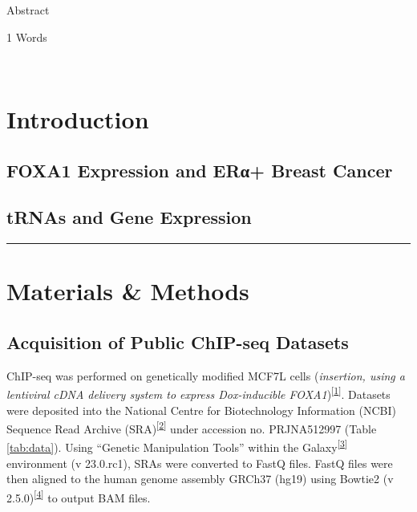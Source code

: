 \documentclass[
  12pt,
]{article}
\begin{document}
Abstract

\normalsize
\begin{flushright}
1 Words
\end{flushright}
\hrulefill\\
\setlength{\parindent}{10pt}

\hypertarget{introduction}{%
\section{Introduction}\label{introduction}}

\hypertarget{foxa1-expression-and-erux3b1-breast-cancer}{%
\subsection{FOXA1 Expression and ERα+ Breast Cancer}\label{foxa1-expression-and-erux3b1-breast-cancer}}

\hypertarget{trnas-and-gene-expression}{%
\subsection{tRNAs and Gene Expression}\label{trnas-and-gene-expression}}

\begin{center}\rule{0.5\linewidth}{0.5pt}\end{center}

\hypertarget{materials-methods}{%
\section{Materials \& Methods}\label{materials-methods}}

\hypertarget{acquisition-of-public-chip-seq-datasets}{%
\subsection{Acquisition of Public ChIP-seq Datasets}\label{acquisition-of-public-chip-seq-datasets}}

ChIP-seq was performed on genetically modified MCF7L cells (\emph{insertion, using a lentiviral cDNA delivery system to express Dox-inducible FOXA1})\textsuperscript{{[}\protect\hyperlink{ref-fu2019}{1}{]}}.
Datasets were deposited into the National Centre for Biotechnology Information (NCBI) Sequence Read Archive (SRA)\textsuperscript{{[}\protect\hyperlink{ref-leinonen2010}{2}{]}} under accession no.
PRJNA512997 (Table \ref{tab:data}).
Using ``Genetic Manipulation Tools'' within the Galaxy\textsuperscript{{[}\protect\hyperlink{ref-thegala2022}{3}{]}} environment (v 23.0.rc1), SRAs were converted to FastQ files.
FastQ files were then aligned to the human genome assembly GRCh37 (hg19) using Bowtie2 (v 2.5.0)\textsuperscript{{[}\protect\hyperlink{ref-langmead2012}{4}{]}} to output BAM files.
\end{document}
